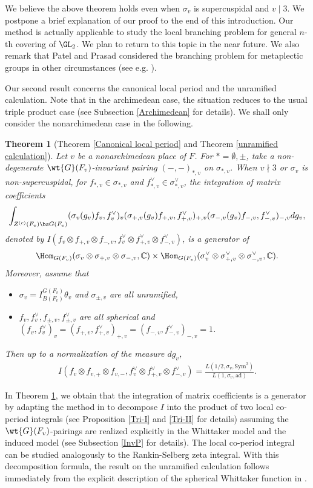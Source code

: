 \documentclass[11pt,reqno]{amsart}
\newcommand{\BC}{{\mathbb {C}}} \newcommand{\BD}{{\mathbb {D}}}
\newcommand{\ad}{{\mathrm{ad}}}\newcommand{\al}{{\mathrm{al}}}
\newcommand{\Sym}{{\mathrm{Sym}}}\newcommand{\sgn}{{\mathrm{sgn}}}
\theoremstyle{plain}
\newtheorem{thm}{Theorem}[section] \newtheorem{cor}[thm]{Corollary}
\theoremstyle{remark} \newtheorem{remark}[thm]{Remark}
\theoremstyle{definition} \newtheorem{exercise}[thm]{Exercise}
\theoremstyle{definition} \newtheorem{example}[thm]{Example} \newtheorem{condition}[thm]{Condition}
\numberwithin{equation}{section}
\renewcommand{\-}{\text{--}}
\begin{document}
 We believe the above theorem  holds even when $\sigma_v$ is supercuspidal and   $v\mid 3$. We postpone a brief explanation of 
 our proof to the end of this introduction.  Our method is actually applicable to study the local branching problem for general $n$-th covering of $\GL_2$. We plan to return to this topic in the near future. We also remark that Patel and Prasad considered the branching problem for metaplectic groups in other circumstances (see e.g. \cite{PP16,PP18}).


  Our second result concerns the canonical local period and the unramified calculation. Note that in the archimedean case, the situation reduces to the usual triple product case (see Subsection \ref{Archimedean} for details).  We shall only consider the nonarchimedean case in the following. 
  
\begin{thm}[Theorem \ref{Canonical local period} and Theorem \ref{unramified calculation}]
\label{Local-Unr}
Let $v$ be a nonarchimedean place of $F$. For $*=\emptyset,\pm$, take a non-degenerate $\wt{G}(F_v)$-invariant pairing $(-,-)_{*,v}$ on $\sigma_{*,v}$. When  $v\nmid 3$ or $\sigma_v$ is non-supercuspidal, for 
$f_{*,v} \in \sigma_{*,v}$ and $
 f_{*,v}^\vee \in \sigma_{*,v}^\vee$,  the integration of matrix coefficients
\[\int_{Z^{(c)}(F_v)\bs G(F_v)}( \sigma_v(g_v)f_v, f_v^\vee)_v( \sigma_{+,v}(g_v)f_{+,v}, f_{+,v}^\vee)_{+,v} ( \sigma_{-,v}(g_v)f_{-,v}, f_{-,v}^\vee)_{-,v} d g_v,\]
 denoted by $I(f_v\otimes f_{+,v}\otimes f_{-,v}, f_v^\vee\otimes f_{+,v}^\vee\otimes f_{-,v}^\vee)$, 
is  a generator of \[\Hom_{G(F_v)}(\sigma_v\otimes\sigma_{+,v}\otimes \sigma_{-,v},\BC)\times \Hom_{G(F_v)}(\sigma_v^\vee\otimes\sigma^\vee_{+,v}\otimes \sigma^\vee_{-,v},\BC).\] 
Moreover, assume that 
\begin{itemize}
\item $\sigma_v=I_{B(F_v)}^{G(F_v)}\theta_v$ and $\sigma_{\pm,v}$ are all unramified,
\item $f_v,f_v^\vee, f_{\pm,v},f_{\pm,v}^\vee$ are all spherical and $( f_v, f_v^\vee)_v=( f_{+,v}, f_{+,v}^\vee)_{+,v} =( f_{-,v}, f_{-,v}^\vee)_{-,v}=1$.
\end{itemize}
Then up to a normalization of the measure $d g_v$,
\begin{align*}
    I(f_v \otimes f_{v,+}\otimes f_{v,-}, f_v^\vee \otimes f_{+,v}^\vee\otimes f_{-,v}^\vee)=\frac{L(1/2,\sigma_v,\Sym^3)}{L(1,\sigma_v,\ad)}.
\end{align*}
\end{thm}
In Theorem \ref{Local-Unr},  we obtain that the integration of matrix coefficients  is a generator  by adapting the method in \cite[Proposition 5.2]{Hsi21} to  decompose $I$ into the product of two local co-period integrals (see Proposition \ref{Tri-I} and \ref{Tri-II} for details) assuming the $\wt{G}(F_v)$-pairings are realized explicitly in the Whittaker model and the induced model (see Subsection \ref{InvP} for details).  The local co-period integral can be studied analogously to the Rankin-Selberg zeta integral. With this decomposition formula, the result on the unramified calculation  follows immediately from the explicit description of the spherical Whittaker function in \cite[Theorem I.4.2]{KP84}.
\end{document}
